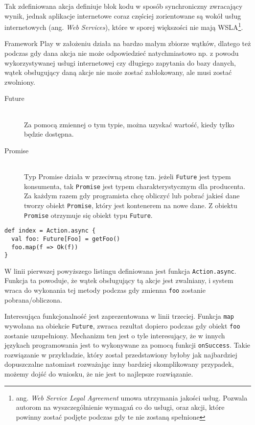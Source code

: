 \par

Tak zdefiniowana akcja definiuje blok kodu w sposób synchroniczny zwracający wynik, jednak aplikacje internetowe coraz częściej zorientowane są wokół usług internetowych (ang. \emph{Web Services}), które w sporej większości nie mają WSLA\footnote{ang. \emph{Web Service Legal Agreement} umowa utrzymania jakości usług. Pozwala autorom na wyszczególnienie wymagań co do usługi, oraz akcji, które powinny zostać podjęte podczas gdy te nie zostaną spełnione}.

\par

Framework Play w założeniu działa na bardzo małym zbiorze wątków, dlatego też podczas gdy dana akcja nie może odpowiedzieć natychmiastowo np. z powodu wykorzystywanej usługi internetowej czy długiego zapytania do bazy danych, wątek obsługujący daną akcje nie może zostać zablokowany, ale musi zostać zwolniony.

\begin{description}	
	\item[Future] \hfill \\
		Za pomocą zmiennej o tym typie, można uzyskać wartość, kiedy tylko będzie dostępna.
	\item[Promise] \hfill \\
		Typ Promise działa w przeciwną stronę tzn. jeżeli \lstinline{Future} jest typem konsumenta, tak \lstinline{Promise} jest typem charakterystycznym dla producenta. Za każdym razem gdy programista chcę obliczyć lub pobrać jakieś dane tworzy obiekt \lstinline{Promise}, który jest kontenerem na nowe dane. Z obiektu \lstinline{Promise} otrzymuje się obiekt typu \lstinline{Future}.
\end{description}

\begin{lstlisting}
def index = Action.async {
  val foo: Future[Foo] = getFoo()
  foo.map(f => Ok(f))
}
\end{lstlisting}

\par

W linii pierwszej powyższego listingu definiowana jest funkcja \lstinline{Action.async}. Funkcja ta powoduje, że wątek obsługujący tą akcje jest zwalniany, i system wraca do wykonania tej metody podczas gdy zmienna \lstinline{foo} zostanie pobrana/obliczona.

\par
Interesująca funkcjonalność jest zaprezentowana w linii trzeciej. Funkcja \lstinline{map} wywołana na obiekcie \lstinline{Future}, zwraca rezultat dopiero podczas gdy obiekt \lstinline{foo} zostanie uzupełniony. Mechanizm ten jest o tyle interesujący, że w innych językach programowania jest to wykonywane za pomocą funkcji \lstinline{onSuccess}. Takie rozwiązanie w przykładzie, który został przedstawiony byłoby jak najbardziej dopuszczalne natomiast rozważając inny bardziej skomplikowany przypadek, możemy dojść do wniosku, że nie jest to najlepsze rozwiązanie.

